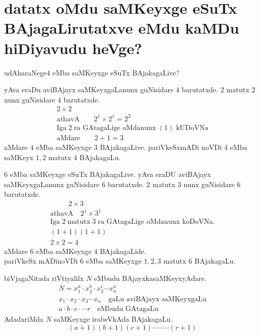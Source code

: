 \chapter{{\bf datatx oMdu saMKeyxge eSuTx BAjagaLirutatxve eMdu kaMDu hiDiyavudu heVge?}}


udAharaNege\quad $4$ eMba saMKeyxge eSuTx BAjakagaLive?

yAva eraDu aviBAjayx saMKeyxgaLanunx guNisidare $4$ barutatxde. $2$ matutx $2$ nunx guNisidare $4$ barutatxde.
\begin{gather*}
2\times 2\\
\text{athavA} \qquad 2^1\times 2^1 = 2^2\\
\text{Iga}\; 2 \;\text{ra GAtagaLige oMdanunx} \;(1)\; \text{kUDoVNa}\\
\text{aMdare}\qquad 2+1 =3
\end{gather*}
aMdare $4$ eMba saMKeyxge $3$ BAjakagaLive. pariVkeSxmADi noVDi $4$ eMba saMKeyx $1,2$ matutx $4$ BAjakagaLu. 


$6$ eMba saMKeyxge eSuTx BAjakagaLive. yAva eraDU aviBAjayx saMKeyxgaLanunx guNisidare $6$ barutatxde.
$2$ matutx $3$ nunx guNisidare $6$ barutatxde.
\begin{gather*}
\qquad\;\; 2 \times 3\\
\text{athavA}\quad 2^1 \times 3^1\\
\text{Iga} \;2\; \text{matutx} \;3\; \text{ra GAtagaLige oMdanunx koDoVNa.}\\
(1+1)(1+1)\\
2\times 2 =4 
\end{gather*}
aMdare $6$ eMba saMKeyxge $4$ BAjakagaLide.\\
pariVkeSx mADinoVDi $6$ eMba saMKeyxge $1,2,3$ matutx $6$ BAjakagaLu.

biVjagaNitada riVtiyalilx $N$ eMbudu BAjayxkasaMKeyxyAdare.
\begin{gather*}
N=x_1^a \cdot x_2^b\cdot x_3^c \cdots x_n^x\\
x_1\cdot x_2\cdot x_3 \cdots x_n \quad\text{gaLu aviBAjayx saMKeyxgaLu}\\
a \cdot b\cdot c\cdot \cdots r \quad\text{eMbudu GAtagaLu}
\end{gather*}
AdadxriMda $N$ saMKeyxge irabeVkAda BAjakagaLu.
$$
(a+1)(b+1)(c+1)\cdots\cdots\cdots(r+1)
$$
